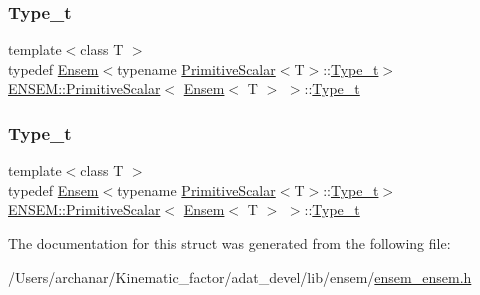 \subsubsection{\texorpdfstring{Type\_t}{Type\_t}\hspace{0.1cm}{\footnotesize\ttfamily [1/2]}}
{\footnotesize\ttfamily template$<$class T $>$ \\
typedef \mbox{\hyperlink{classENSEM_1_1Ensem}{Ensem}}$<$typename \mbox{\hyperlink{structENSEM_1_1PrimitiveScalar}{Primitive\+Scalar}}$<$T$>$\+::\mbox{\hyperlink{structENSEM_1_1PrimitiveScalar_3_01Ensem_3_01T_01_4_01_4_af9a7554dcb219c3d60465d27682b73bf}{Type\+\_\+t}}$>$ \mbox{\hyperlink{structENSEM_1_1PrimitiveScalar}{E\+N\+S\+E\+M\+::\+Primitive\+Scalar}}$<$ \mbox{\hyperlink{classENSEM_1_1Ensem}{Ensem}}$<$ T $>$ $>$\+::\mbox{\hyperlink{structENSEM_1_1PrimitiveScalar_3_01Ensem_3_01T_01_4_01_4_af9a7554dcb219c3d60465d27682b73bf}{Type\+\_\+t}}}

\mbox{\label{structENSEM_1_1PrimitiveScalar_3_01Ensem_3_01T_01_4_01_4_af9a7554dcb219c3d60465d27682b73bf}} 
\subsubsection{\texorpdfstring{Type\_t}{Type\_t}\hspace{0.1cm}{\footnotesize\ttfamily [2/2]}}
{\footnotesize\ttfamily template$<$class T $>$ \\
typedef \mbox{\hyperlink{classENSEM_1_1Ensem}{Ensem}}$<$typename \mbox{\hyperlink{structENSEM_1_1PrimitiveScalar}{Primitive\+Scalar}}$<$T$>$\+::\mbox{\hyperlink{structENSEM_1_1PrimitiveScalar_3_01Ensem_3_01T_01_4_01_4_af9a7554dcb219c3d60465d27682b73bf}{Type\+\_\+t}}$>$ \mbox{\hyperlink{structENSEM_1_1PrimitiveScalar}{E\+N\+S\+E\+M\+::\+Primitive\+Scalar}}$<$ \mbox{\hyperlink{classENSEM_1_1Ensem}{Ensem}}$<$ T $>$ $>$\+::\mbox{\hyperlink{structENSEM_1_1PrimitiveScalar_3_01Ensem_3_01T_01_4_01_4_af9a7554dcb219c3d60465d27682b73bf}{Type\+\_\+t}}}



The documentation for this struct was generated from the following file\+:\begin{DoxyCompactItemize}
\item 
/\+Users/archanar/\+Kinematic\+\_\+factor/adat\+\_\+devel/lib/ensem/\mbox{\hyperlink{lib_2ensem_2ensem__ensem_8h}{ensem\+\_\+ensem.\+h}}\end{DoxyCompactItemize}
